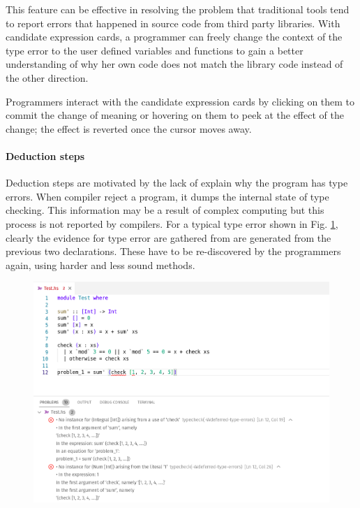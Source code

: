 This feature can be effective in resolving the problem that traditional tools tend to report errors that happened in source code from third party libraries. With candidate expression cards, a programmer can freely change the context of the type error to the user defined variables and functions to gain a better understanding of why her own code does not match the library code instead of the other direction.


Programmers interact with the candidate expression cards by clicking on them to commit the change of meaning or hovering on them to peek at the effect of the change; the effect is reverted once the cursor moves away.


\paragraph{Deduction steps}  \label{sub:deduction-steps}

Deduction steps are motivated by the lack of explain why the program has  type errors. When compiler reject a program, it dumps the internal state of type checking.  This information may be a result of complex computing but this process is not reported by compilers. For a typical type error shown in Fig. \ref{fig:ghc-error-example}, clearly the evidence for type error are gathered from are generated from the previous two declarations. These have to be re-discovered by the programmers again, using harder and less sound methods. 

\begin{figure}[h]
    \centering
    \includegraphics[width=\linewidth]{images/ghc-error-example.png}
    \caption{
        }
    \label{fig:ghc-error-example}
\end{figure}

